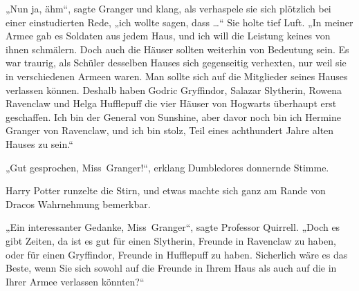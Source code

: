 „Nun ja, ähm“, sagte Granger und klang, als verhaspele sie sich plötzlich bei einer einstudierten Rede, „ich wollte sagen, dass …“ Sie holte tief Luft.
„In meiner Armee gab es Soldaten aus jedem Haus, und ich will die Leistung keines von ihnen schmälern. Doch auch die Häuser sollten weiterhin von Bedeutung sein. Es war traurig, als Schüler desselben Hauses sich gegenseitig verhexten, nur weil sie in verschiedenen Armeen waren. Man sollte sich auf die Mitglieder seines Hauses verlassen können. Deshalb haben Godric Gryffindor, Salazar Slytherin, Rowena Ravenclaw und Helga Hufflepuff die vier Häuser von Hogwarts überhaupt erst geschaffen. Ich bin der General von Sunshine, aber davor noch bin ich Hermine Granger von Ravenclaw, und ich bin stolz, Teil eines achthundert Jahre alten Hauses zu sein.“

„Gut gesprochen, Miss~Granger!“, erklang Dumbledores donnernde Stimme.

Harry Potter runzelte die Stirn, und etwas machte sich ganz am Rande von Dracos Wahrnehmung bemerkbar.

„Ein interessanter Gedanke, Miss~Granger“, sagte Professor Quirrell.
„Doch es gibt Zeiten, da ist es gut für einen Slytherin, Freunde in Ravenclaw zu haben, oder für einen Gryffindor, Freunde in Hufflepuff zu haben. Sicherlich wäre es das Beste, wenn Sie sich sowohl auf die Freunde in Ihrem Haus als auch auf die in Ihrer Armee verlassen könnten?“

